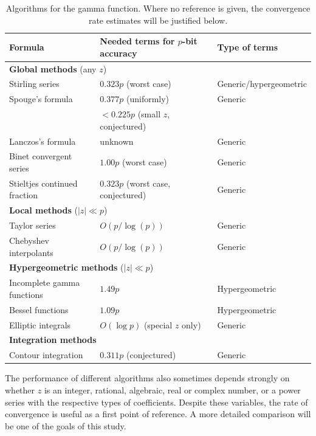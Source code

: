 \documentclass[reqno]{amsart}
\theoremstyle{definition}
\begin{document}
\begin{table}%
\setlength{\tabcolsep}{3pt}
\renewcommand{\arraystretch}{1.02}
\centering
\caption{Algorithms for the gamma function. Where no reference is given, the convergence rate
estimates will be justified below.}
\label{tab:algoverview}
\small
\begin{tabular}{p{4.1cm} p{4.5cm} l}
Formula                      & Needed terms for $p$-bit accuracy                    & Type of terms \\ \hline
    \multicolumn{3}{l}{\textbf{Global methods} (any $z$)} \\
Stirling series              & $0.323 p$ (worst case)        & Generic/hypergeometric \\
Spouge's formula       & $0.377 p$ (uniformly)         & Generic \\
                             & $< 0.225 p$ (small $z$, conjectured)    &  \\
Lanczos's formula      & unknown & Generic \\
Binet convergent series      & $1.00 p$ (worst case)        & Generic \\
Stieltjes continued fraction   & $0.323 p$ (worst case, conjectured)        & Generic \\
   \multicolumn{3}{l}{\textbf{Local methods} ($|z| \ll p$)} \\
Taylor series  & $O(p / \log(p))$             & Generic \\
Chebyshev interpolants  & $O(p / \log(p))$             & Generic \\
   \multicolumn{3}{l}{\textbf{Hypergeometric methods} ($|z| \ll p$)} \\
Incomplete gamma functions   & $1.49 p$        & Hypergeometric \\
Bessel functions             & $1.09 p$        & Hypergeometric \\
Elliptic integrals           & $O(\log p)$ (special $z$ only)        & Generic \\
   \multicolumn{3}{l}{\textbf{Integration methods}} \\
Contour integration          & $0.311 p$ (conjectured) \cite{schmelzer2007computing}  &  Generic \\
\end{tabular}
\end{table}


The performance of different algorithms
also sometimes depends strongly on whether $z$ is
an integer, rational, algebraic, real or complex number,
or a power series with the respective types of coefficients.
Despite these variables, the rate of convergence is useful as a first point
of reference. A more detailed comparison will be one
of the goals of this study.
\end{document}
